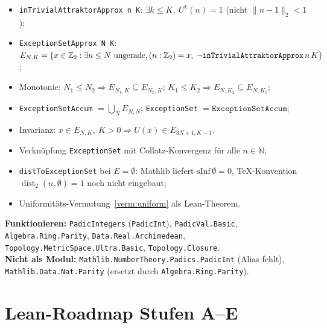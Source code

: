 \documentclass[12pt,a4paper]{article}
\newcommand{\N}{\mathbb{N}}
\newcommand{\Ztwo}{\mathbb{Z}_2}
\newcommand{\disttwo}{\operatorname{dist}_2}
\begin{document}
\begin{tcolorbox}[bewiesen,title={ExceptionSetApprox und Limes $E$ (Lean)}]
\begin{itemize}[nosep]
  \item \texttt{inTrivialAttraktorApprox n K}: $\exists k\leq K,\ U^k(n)=1$ (nicht $\|n-1\|_2<1$);
  \item \texttt{ExceptionSetApprox N K}: $E_{N,K}=\{x\in\Ztwo:\exists n\leq N\text{ ungerade},
    (n:\Ztwo)=x,\ \neg\text{\texttt{inTrivialAttraktorApprox}\,}n\,K\}$;
  \item Monotonie: $N_1\leq N_2\Rightarrow E_{N_1,K}\subseteq E_{N_2,K}$;
    $K_1\leq K_2\Rightarrow E_{N,K_2}\subseteq E_{N,K_1}$;
  \item \texttt{ExceptionSetAccum} $=\bigcup_N E_{N,N}$;
    \texttt{ExceptionSet} $=\overline{\texttt{ExceptionSetAccum}}$;
  \item Invarianz: $x\in E_{N,K},\ K>0\Rightarrow U(x)\in E_{3N+1,K-1}$.
\end{itemize}
\end{tcolorbox}

\begin{tcolorbox}[heuristik,title={Noch offen (Stufe E)}]
\begin{itemize}[nosep]
  \item Verkn\"upfung \texttt{ExceptionSet} mit Collatz-Konvergenz f\"ur alle $n\in\N$;
  \item \texttt{distToExceptionSet} bei $E=\emptyset$: Mathlib liefert $\mathrm{sInf}\,\emptyset=0$,
    TeX-Konvention $\disttwo(n,\emptyset)=1$ noch nicht eingebaut;
  \item Uniformit\"ats-Vermutung~\ref{verm:uniform} als Lean-Theorem.
\end{itemize}
\end{tcolorbox}

\begin{tcolorbox}[kern,title={Mathlib-Imports (4.29)}]
\textbf{Funktionieren:} \texttt{PadicIntegers} (\texttt{PadicInt}), \texttt{PadicVal.Basic},
\texttt{Algebra.Ring.Parity}, \texttt{Data.Real.Archimedean}, \texttt{Topology.MetricSpace.Ultra.Basic},
\texttt{Topology.Closure}.\\
\textbf{Nicht als Modul:} \texttt{Mathlib.NumberTheory.Padics.PadicInt} (Alias fehlt),
\texttt{Mathlib.Data.Nat.Parity} (ersetzt durch \texttt{Algebra.Ring.Parity}).
\end{tcolorbox}

\section{Lean-Roadmap Stufen A--E}
\label{sec:roadmap}
\end{document}
